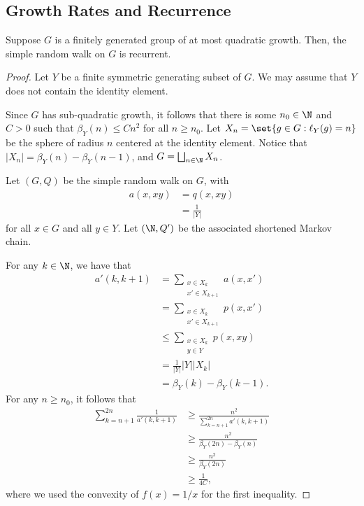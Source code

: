\documentclass[10pt]{mypackage}
\begin{document}
\subsection{Growth Rates and Recurrence}%
\begin{proposition}
  Suppose $G$ is a finitely generated group of at most quadratic growth. Then, the simple random walk on $G$ is recurrent.
\end{proposition}
\begin{proof}
  Let $Y$ be a finite symmetric generating subset of $G$. We may assume that $Y$ does not contain the identity element.

  Since $G$ has sub-quadratic growth, it follows that there is some $n_0\in \N$ and $C > 0$ such that $\beta_{Y}\left( n \right)\leq Cn^2$ for all $n\geq n_0$. Let $X_n = \set{g\in G : \ell_Y(g) = n}$ be the sphere of radius $n$ centered at the identity element. Notice that $\left\vert X_n \right\vert = \beta_{Y}(n)-\beta_{Y}(n-1)$, and $G = \bigsqcup_{n\in \N}X_n$.

  Let $\left( G,Q \right)$ be the simple random walk on $G$, with
  \begin{align*}
    a \left( x,xy \right) &= q\left( x,xy \right)\\
                          &= \frac{1}{\left\vert Y \right\vert}
  \end{align*}
  for all $x\in G$ and all $y\in Y$. Let $\left( \N,Q' \right)$ be the associated shortened Markov chain.

  For any $k\in \N$, we have that
  \begin{align*}
    a'\left( k,k+1 \right) &= \sum_{\substack{x\in X_k\\x'\in X_{k+1}}} a\left( x,x' \right)\\
                           &= \sum_{\substack{x\in X_k\\x'\in X_{k+1}}} p\left( x,x' \right)\\
                           &\leq \sum_{\substack{x\in X_k\\y\in Y}}p\left( x,xy \right)\\
                           &= \frac{1}{\left\vert Y \right\vert} \left\vert Y \right\vert \left\vert X_k \right\vert\\
                           &= \beta_Y(k) - \beta_Y\left( k-1 \right).
  \end{align*}
  For any $n\geq n_0$, it follows that
  \begin{align*}
    \sum_{k=n+1}^{2n} \frac{1}{a'\left( k,k+1 \right)} &\geq \frac{n^2}{\sum_{k=n+1}^{2n}a'\left( k,k+1 \right)}\\
                                                       &\geq \frac{n^2}{\beta_Y\left( 2n \right) - \beta_Y(n)}\\
                                                       &\geq \frac{n^2}{\beta_Y\left( 2n \right)}\\
                                                       &\geq \frac{1}{4C},
  \end{align*}
  where we used the convexity of $f(x) = 1/x$ for the first inequality.


\end{proof}
\end{document}
